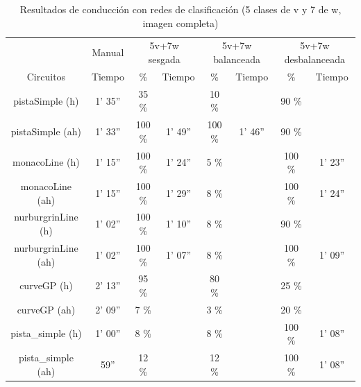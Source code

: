 \begin{table}[H]
\centering
\caption{Resultados de conducción con redes de clasificación (5 clases de v y 7 de w, imagen completa)}
\label{resultados_classificacion_normal_5v_7w}
\begin{tabular}{c|c|c|c|c|c|c|c|}
\cline{2-8}
                          & \multicolumn{1}{c|}{Manual} & \multicolumn{2}{c|}{5v+7w sesgada} & \multicolumn{2}{c|}{5v+7w balanceada} & \multicolumn{2}{c|}{5v+7w desbalanceada} \\ \cline{1-8} 
                        \multicolumn{1}{|c|}{Circuitos}    & Tiempo       & \%       & Tiempo       & \%        & Tiempo       & \%      & Tiempo     \\ \hline
\multicolumn{1}{|c|}{pistaSimple (h)}    & 1' 35''           & 35 \%         &            & 10 \%          &            & 90 \%       &       \\ \hline
\multicolumn{1}{|c|}{pistaSimple (ah)}     & 1' 33''           & 100 \%          & 1' 49''            & 100 \%           & 1' 46''           & 90 \%       &       \\ \hline
\multicolumn{1}{|c|}{monacoLine (h)}      & 1' 15''           & 100 \%           & 1' 24''            & 5 \%       &             & 100 \%       &  1' 23''          \\ \hline
\multicolumn{1}{|c|}{monacoLine (ah)}       & 1' 15''            & 100 \%       & 1' 29''            & 8 \%           &             & 100 \%          & 1' 24''       \\ \hline
\multicolumn{1}{|c|}{nurburgrinLine (h)}      & 1' 02''            & 100 \%          & 1' 10''            & 8 \%        &             & 90 \%       &       \\ \hline
\multicolumn{1}{|c|}{nurburgrinLine (ah)}       & 1' 02''           & 100 \%           & 1' 07''           & 8 \%        &            & 100 \%       & 1' 09''       \\ \hline
\multicolumn{1}{|c|}{curveGP (h)}     & 2' 13''           & 95 \%           &            & 80 \%        &            & 25 \%       &      \\ \hline
\multicolumn{1}{|c|}{curveGP (ah)}       & 2' 09''            & 7 \%         &             & 3 \%        &            & 20 \%      &      \\ \hline
\multicolumn{1}{|c|}{pista\_simple (h)}       & 1' 00''           & 8 \%          &           & 8 \%        &             & 100 \%      & 1' 08''       \\ \hline
\multicolumn{1}{|c|}{pista\_simple (ah)}     & 59''            & 12 \%          &          & 12 \%        &             & 100 \%      & 1' 08''        \\ \hline
\end{tabular}
\end{table}

